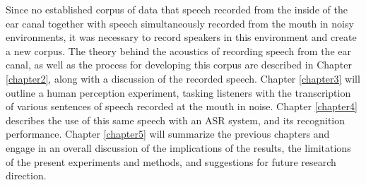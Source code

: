 Since \DIFdelbegin {}\DIFdelend \DIFaddbegin {}\DIFaddend no established corpus of data that \DIFdelbegin {}\DIFdelend \DIFaddbegin {}\DIFaddend speech recorded from the inside of the ear canal together with speech simultaneously recorded from the mouth in noisy environments, it was necessary to record \DIFaddbegin {}\DIFaddend speakers in this environment and create a new corpus.  The theory behind the acoustics of recording speech from the ear canal, as well as the process for developing this corpus are described in Chapter \ref{chapter2}, along with a discussion of the recorded speech.  Chapter \ref{chapter3} will outline a human perception experiment, tasking listeners with the transcription of various sentences of speech recorded \DIFaddbegin {}\DIFaddend at the mouth in noise\DIFdelbegin {}\DIFdelend \DIFaddbegin {}\DIFaddend .  Chapter \ref{chapter4} describes the use of this same speech with an ASR system, and its recognition performance.  Chapter \ref{chapter5} will summarize the previous chapters and engage in an overall discussion of the implications of the results, the limitations of the present experiments and methods, and suggestions for future research direction.


